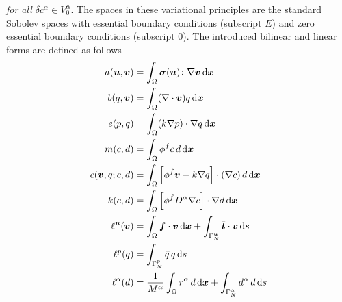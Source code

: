 \documentclass[a4paper,DIV=12,10pt]{scrartcl}
\newcommand{\U}[0]{\vek{u}}
\newcommand{\V}[0]{\vek{v}}
\newcommand{\x}[0]{\vek{x}}
\begin{document}
\emph{for all $\delta c^\alpha \in V^\alpha_0$}.
The spaces in these variational principles are the standard Sobolev spaces
with essential boundary conditions (subscript $E$) and zero essential boundary
conditions (subscript $0$). The introduced bilinear and linear forms are
defined as follows
\begin{subequations} \label{eq:forms}
  \begin{align}
      a(\U,\V) &= \int_\Omega \vek{\sigma}(\U) \colon \nabla \V \dif \x 
      \label{eq:formsA} \\
      b(q,\V) &= \int_\Omega (\nabla \cdot \V) q \dif \x
      \label{eq:formsB} \\
      e(p,q) &= \int_\Omega (k \nabla p) \cdot \nabla q \dif \x
      \label{eq:formsE} \\
      m(c,d) &= \int_\Omega \phi^f c \,d \dif \x
      \label{eq:formsM} \\
      c(\V,q; c, d) &= \int_\Omega \left[ \phi^f \V - k \nabla q \right] \cdot
      (\nabla c) \, d \dif \x
      \label{eq:formsC} \\
      k(c, d) &= \int_\Omega \left[ \phi^f D^\alpha \nabla c\right] \cdot 
      \nabla d \dif \x
      \label{eq:formsK} \\
      \ell^{\U}(\V) &= \int_\Omega \vek{f} \cdot \V \dif \x +
      \int_{\Gamma_N^{\U}} \bar{\vek{t}} \cdot \V \dif s
      \label{eq:formsLU} \\
      \ell^p(q) &= \int_{\Gamma^p_N} \bar{q} \, q \dif s
      \label{eq:formsLP} \\
      \ell^\alpha(d) &= 
      \frac{1}{M^\alpha} \int_\Omega r^\alpha \, d \dif \x +
      \int_{\Gamma^\alpha_N} \bar{d}^\alpha \, d \dif s
      \label{eq:formsLA} 
  \end{align}
\end{subequations}
\end{document}

